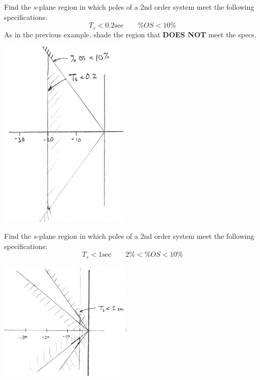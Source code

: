 \begin{ExampleSmall}
Find the $s$-plane region in which poles of a 2nd order system meet the following specifications:
\[
T_s < 0.2 \mathrm{sec} \qquad \%OS < 10\%
\]
As in the previous example, shade the region that {\bf DOES NOT} meet the specs. 

\includegraphics[width=2.5in]{figs09/00789a.png}
\end{ExampleSmall}

\begin{ExampleSmall}
Find the $s$-plane region in which poles of a 2nd order system meet the following specifications:
\[
T_s < 1 \mathrm{sec} \qquad 2\% < \%OS < 10\%
\]

\includegraphics[width=2.5in]{figs09/00790a.png}
\end{ExampleSmall}


